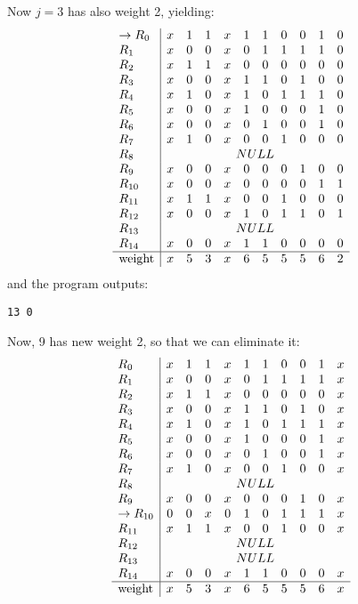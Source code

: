 \documentclass{article}
\begin{document}
Now $j=3$ has also weight 2, yielding:
$$
\begin{array}{l|cccccccccc}
\rightarrow R_{0}& x& 1& 1& x& 1& 1& 0& 0& 1& 0\\
R_{1}& x& 0& 0& x& 0& 1& 1& 1& 1& 0\\
R_{2}& x& 1& 1& x& 0& 0& 0& 0& 0& 0\\
R_{3}& x& 0& 0& x& 1& 1& 0& 1& 0& 0\\
R_{4}& x& 1& 0& x& 1& 0& 1& 1& 1& 0\\
R_{5}& x& 0& 0& x& 1& 0& 0& 0& 1& 0\\
R_{6}& x& 0& 0& x& 0& 1& 0& 0& 1& 0\\
R_{7}& x& 1& 0& x& 0& 0& 1& 0& 0& 0\\
R_{8}& \multicolumn{10}{c}{NULL} \\
R_{9}& x& 0& 0& x& 0& 0& 0& 1& 0& 0\\
R_{10}& x& 0& 0& x& 0& 0& 0& 0& 1& 1\\
R_{11}& x& 1& 1& x& 0& 0& 1& 0& 0& 0\\
R_{12}& x& 0& 0& x& 1& 0& 1& 1& 0& 1\\
R_{13}& \multicolumn{10}{c}{NULL} \\
R_{14}& x& 0& 0& x& 1& 1& 0& 0& 0& 0\\
\hline
\text{weight}& x& 5& 3& x& 6& 5& 5& 5& 6& 2\\
\end{array}
$$
and the program outputs:
\begin{verbatim}
13 0
\end{verbatim}
Now, 9 has new weight 2, so that we can eliminate it:
$$
\begin{array}{l|cccccccccc}
R_{0}& x& 1& 1& x& 1& 1& 0& 0& 1& x\\
R_{1}& x& 0& 0& x& 0& 1& 1& 1& 1& x\\
R_{2}& x& 1& 1& x& 0& 0& 0& 0& 0& x\\
R_{3}& x& 0& 0& x& 1& 1& 0& 1& 0& x\\
R_{4}& x& 1& 0& x& 1& 0& 1& 1& 1& x\\
R_{5}& x& 0& 0& x& 1& 0& 0& 0& 1& x\\
R_{6}& x& 0& 0& x& 0& 1& 0& 0& 1& x\\
R_{7}& x& 1& 0& x& 0& 0& 1& 0& 0& x\\
R_{8}& \multicolumn{10}{c}{NULL} \\
R_{9}& x& 0& 0& x& 0& 0& 0& 1& 0& x\\
\rightarrow R_{10}& 0& 0& x& 0& 1& 0& 1& 1& 1& x\\
R_{11}& x& 1& 1& x& 0& 0& 1& 0& 0& x\\
R_{12}& \multicolumn{10}{c}{NULL} \\
R_{13}& \multicolumn{10}{c}{NULL} \\
R_{14}& x& 0& 0& x& 1& 1& 0& 0& 0& x\\
\hline
\text{weight}& x& 5& 3& x& 6& 5& 5& 5& 6& x\\
\end{array}
$$
\end{document}
